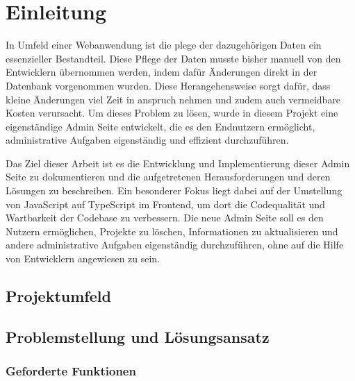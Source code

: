 \section{Einleitung}
In Umfeld einer Webanwendung ist die plege der dazugehörigen Daten ein essenzieller Bestandteil.
Diese Pflege der Daten musste bisher manuell von den Entwicklern übernommen werden, indem dafür Änderungen direkt in der Datenbank vorgenommen wurden.
Diese Herangehensweise sorgt dafür, dass kleine Änderungen viel Zeit in anspruch nehmen und zudem auch vermeidbare Kosten verursacht.
Um dieses Problem zu lösen, wurde in diesem Projekt eine eigenständige Admin Seite entwickelt, die es den Endnutzern ermöglicht, administrative Aufgaben eigenständig und effizient durchzuführen.

Das Ziel dieser Arbeit ist es die Entwicklung und Implementierung dieser Admin Seite zu dokumentieren und die aufgetretenen Herausforderungen und deren Lösungen zu beschreiben.
Ein besonderer Fokus liegt dabei auf der Umstellung von JavaScript auf TypeScript im Frontend, um dort die Codequalität und Wartbarkeit der Codebase zu verbessern.
Die neue Admin Seite soll es den Nutzern ermöglichen, Projekte zu löschen, Informationen zu aktualisieren und andere administrative Aufgaben eigenständig durchzuführen, ohne auf die Hilfe von Entwicklern angewiesen zu sein.

\subsection[Projektumfeld]{Projektumfeld}

\subsection[Problemstellung und Lösungsansatz]{Problemstellung und Lösungsansatz}

\subsubsection[Geforderte Funktionen]{Geforderte Funktionen}